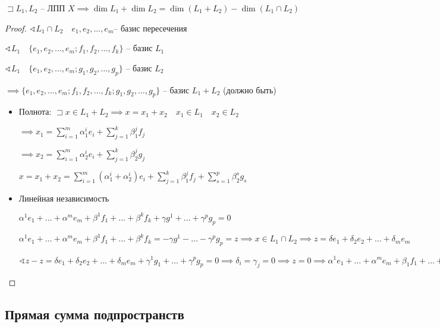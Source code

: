\documentclass{book}
\theoremstyle{definition}
\begin{document}
\begin{theorem}

    $\sqsupset L_1, L_2$ -- ЛПП $X \implies \dim L_1 + \dim L_2 = \dim (L_1+L_2) - \dim (L_1 \cap L_2)$
\end{theorem}
\begin{proof}
    $\sphericalangle L_1\cap L_2\quad e_1, e_2, \ldots, e_m$-- базис пересечения

    $\sphericalangle L_1\quad \{e_1, e_2, \ldots, e_m; f_1, f_2, \ldots, f_k\}$ -- базис $L_1$

    $\sphericalangle L_1\quad \{e_1, e_2, \ldots, e_m;g_1, g_2, \ldots, g_p\}$ -- базис $L_2$

    $\implies \{e_1, e_2, \ldots, e_m;f_1, f_2, \ldots, f_k; g_1, g_2, \ldots, g_p\}$ -- базис $L_1+L_2$ (должно быть)

    \begin{itemize}
        \item Полнота: $\sqsupset x\in L_1+L_2 \implies x = x_1+x_2\quad x_1\in L_1\quad x_2\in L_2$

            $\implies x_1 = \sum_{i=1}^{m} \alpha_1^ie_i + \sum_{j=1}^{k} \beta_1^jf_j$ 

            $\implies x_2= \sum_{i=1}^{m} \alpha_2^ie_i + \sum_{j=1}^{k} \beta_2^jg_j$ 

            $x = x_1+x_2 = \sum_{i=1}^{m} (\alpha_1^i+\alpha_2^i)e_i + \sum_{j=1}^{k} \beta_1^jf_j + \sum_{s=1}^{p} \beta_2^sg_s$ 
        \item Линейная независимость

            $\alpha^1e_1 + \ldots + \alpha^me_m + \beta^1f_1 + \ldots + \beta^kf_k + \gamma g^1 + \ldots + \gamma^pg_p = 0$

            $\alpha^1e_1 + \ldots + \alpha^me_m + \beta^1f_1 + \ldots + \beta^kf_k = - \gamma g^1 - \ldots - \gamma^pg_p = z \implies x\in L_1\cap L_2 \implies z = \delta e_1 +\delta_2e_2 + \ldots + \delta_me_m$

            $\sphericalangle z-z = \delta e_1 +\delta_2e_2 + \ldots + \delta_me_m + \gamma^1g_1 + \ldots + \gamma^pg_p = 0 \implies \delta_i = \gamma_j = 0 \implies z = 0\implies \alpha^1e_1 + \ldots + \alpha^me_m + \beta_1f_1 + \ldots + \beta^kf_k = 0 \implies  \alpha^i = \beta^j = 0$
    \end{itemize}
\end{proof}

\subsection{Прямая сумма подпространств}
\end{document}
